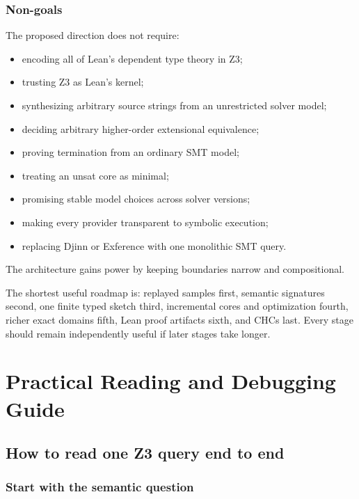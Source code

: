\documentclass[10pt,letterpaper,oneside]{report}
\begin{document}
\section{Non-goals}

The proposed direction does not require:

\begin{itemize}
\item encoding all of Lean's dependent type theory in Z3;
\item trusting Z3 as Lean's kernel;
\item synthesizing arbitrary source strings from an unrestricted solver model;
\item deciding arbitrary higher-order extensional equivalence;
\item proving termination from an ordinary SMT model;
\item treating an unsat core as minimal;
\item promising stable model choices across solver versions;
\item making every provider transparent to symbolic execution;
\item replacing Djinn or Exference with one monolithic SMT query.
\end{itemize}

The architecture gains power by keeping boundaries narrow and compositional.

\begin{checkpoint}
The shortest useful roadmap is: replayed samples first, semantic signatures second, one finite typed sketch third, incremental cores and optimization fourth, richer exact domains fifth, Lean proof artifacts sixth, and CHCs last. Every stage should remain independently useful if later stages take longer.
\end{checkpoint}

\part{Practical Reading and Debugging Guide}

\chapter{How to read one Z3 query end to end}
\label{chap:read-query}

\section{Start with the semantic question}
\end{document}
